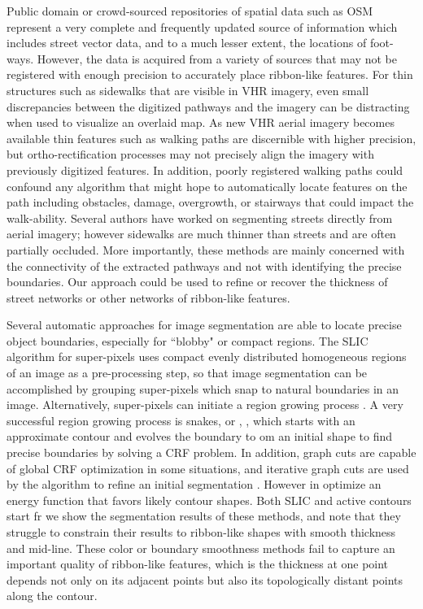 Public domain or crowd-sourced repositories of spatial data such as \ac{OSM} \cite{OpenStreetMap} represent a very complete and frequently updated source of information which includes street vector data, and to a much lesser extent, the locations of foot-ways. 
However, the data is acquired from a variety of sources that may not be registered with enough precision to accurately place ribbon-like features. 
For thin structures such as sidewalks that are visible in \ac{VHR} imagery, even small discrepancies 
between the digitized pathways and the imagery can be distracting when used to visualize an overlaid 
map.  
As new \ac{VHR} aerial imagery becomes available thin features such as walking paths are discernible with higher precision,  but ortho-rectification processes may not precisely align the imagery with previously digitized features. 
In addition, poorly registered walking paths could confound any algorithm that might hope to automatically locate features on the path including obstacles, damage, overgrowth, or stairways that could impact the walk-ability. 
Several authors \cite{femiani2009interval, femiani2007road} have worked on segmenting streets directly from aerial imagery; however sidewalks are much thinner than streets and are often partially occluded. 
More importantly, these methods are mainly concerned with the connectivity of the extracted pathways and not with identifying the precise boundaries.
Our approach could be used to refine or recover the thickness of street networks or other networks of ribbon-like features.

Several automatic approaches \cite{ActiveContou09, Rother2004-ou, Achanta2012-ah} for image segmentation are able to locate precise object boundaries, especially for ``blobby" or compact regions.  
The \ac{SLIC} algorithm for super-pixels \cite{Achanta2012-ah} uses compact evenly distributed homogeneous regions of an image as a pre-processing step, so that image segmentation can be accomplished by grouping super-pixels which  snap to natural boundaries in an image. 
Alternatively, super-pixels can initiate a region growing process \cite{Borovec2017-fz}. A very 
successful region growing process is snakes, or \ActiveContours{}, \cite{ActiveContou09}, which starts 
with an approximate  contour and evolves the boundary to om an initial shape to find precise 
boundaries by solving a \ac{CRF} problem. 
In addition, graph cuts are capable of global \ac{CRF} optimization in some situations, and iterative graph cuts are used by the \GrabCut{} algorithm to refine an initial segmentation \cite{Rother2004-ou}.
However in optimize an energy function that favors likely contour 
shapes. 
Both \ac{SLIC} and active contours start fr we show the segmentation results of these methods, and 
note that  they struggle to constrain their results to ribbon-like shapes with smooth thickness and 
mid-line.
These color or boundary smoothness methods fail to capture an important quality of ribbon-like features, which is the thickness at one point depends not only on its adjacent points but also its topologically distant points along the contour.

